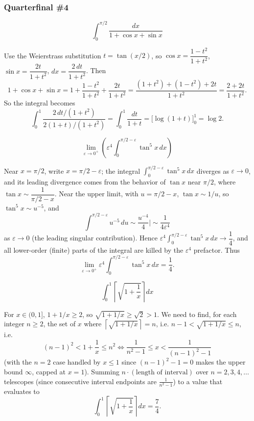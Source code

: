 \subsubsection*{Quarterfinal \#4}
\begin{questions}

\question \[\int_0^{\pi/2}\frac{dx}{1+\cos x+\sin x}\]
\begin{solution}
Use the Weierstrass substitution $t=\tan(x/2)$, so $\cos x=\dfrac{1-t^2}{1+t^2}$, $\sin x=\dfrac{2t}{1+t^2}$, $dx=\dfrac{2\,dt}{1+t^2}$. Then
\[1+\cos x+\sin x=1+\frac{1-t^2}{1+t^2}+\frac{2t}{1+t^2}=\frac{(1+t^2)+(1-t^2)+2t}{1+t^2}=\frac{2+2t}{1+t^2}.\]
So the integral becomes
\[\int_0^1 \frac{2\,dt/(1+t^2)}{2(1+t)/(1+t^2)}=\int_0^1\frac{dt}{1+t}=\big[\log(1+t)\big]_0^1=\log2.\]
\end{solution}

\question \[\lim_{\varepsilon\to0^+}\left(\varepsilon^4\int_0^{\pi/2-\varepsilon}\tan^5x\,dx\right)\]
\begin{solution}
Near $x=\pi/2$, write $x=\pi/2-\varepsilon$; the integral $\int_0^{\pi/2-\varepsilon}\tan^5x\,dx$ diverges as $\varepsilon\to0$, and its leading divergence comes from the behavior of $\tan x$ near $\pi/2$, where $\tan x\sim \dfrac1{\pi/2-x}$. Near the upper limit, with $u=\pi/2-x$, $\tan x\sim 1/u$, so $\tan^5x\sim u^{-5}$, and
\[\int^{\pi/2-\varepsilon} u^{-5}\,du\sim \frac{u^{-4}}{4}\bigg|\sim\frac{1}{4\varepsilon^4}\]
as $\varepsilon\to0$ (the leading singular contribution). Hence $\varepsilon^4\int_0^{\pi/2-\varepsilon}\tan^5x\,dx\to \dfrac14$, and all lower-order (finite) parts of the integral are killed by the $\varepsilon^4$ prefactor. Thus
\[\lim_{\varepsilon\to0^+}\varepsilon^4\int_0^{\pi/2-\varepsilon}\tan^5x\,dx=\frac14.\]
\end{solution}

\question \[\int_0^1 \left\lceil\sqrt{1+\frac1x}\right\rceil dx\]
\begin{solution}
For $x\in(0,1]$, $1+1/x\ge2$, so $\sqrt{1+1/x}\ge\sqrt2>1$. We need to find, for each integer $n\ge2$, the set of $x$ where $\left\lceil\sqrt{1+1/x}\right\rceil=n$, i.e. $n-1<\sqrt{1+1/x}\le n$, i.e.
\[(n-1)^2<1+\frac1x\le n^2 \iff \frac{1}{n^2-1}\le x<\frac{1}{(n-1)^2-1}\]
(with the $n=2$ case handled by $x\le1$ since $(n-1)^2-1=0$ makes the upper bound $\infty$, capped at $x=1$). Summing $n\cdot(\text{length of interval})$ over $n=2,3,4,\dots$ telescopes (since consecutive interval endpoints are $\tfrac1{n^2-1}$) to a value that evaluates to
\[\int_0^1\left\lceil\sqrt{1+\frac1x}\right\rceil dx=\frac74.\]
\end{solution}

\end{questions}

